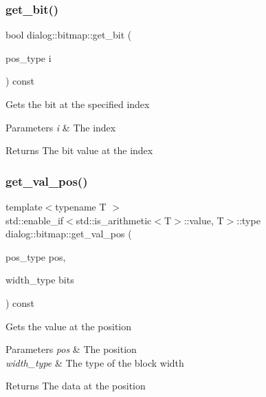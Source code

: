 \mbox{\label{classdialog_1_1bitmap_a50fa02f2e4a94c567f67761988c78d7f}} 
\subsubsection{\texorpdfstring{get\+\_\+bit()}{get\_bit()}}
{\footnotesize\ttfamily bool dialog\+::bitmap\+::get\+\_\+bit (\begin{DoxyParamCaption}\item[{pos\+\_\+type}]{i }\end{DoxyParamCaption}) const\hspace{0.3cm}{\ttfamily [inline]}}

Gets the bit at the specified index 
\begin{DoxyParams}{Parameters}
{\em i} & The index \\
\hline
\end{DoxyParams}
\begin{DoxyReturn}{Returns}
The bit value at the index 
\end{DoxyReturn}
\mbox{\label{classdialog_1_1bitmap_aa56b2e9be38fd068ac374f2f7a33120b}} 
\subsubsection{\texorpdfstring{get\+\_\+val\+\_\+pos()}{get\_val\_pos()}}
{\footnotesize\ttfamily template$<$typename T $>$ \\
std\+::enable\+\_\+if$<$std\+::is\+\_\+arithmetic$<$T$>$\+::value, T$>$\+::type dialog\+::bitmap\+::get\+\_\+val\+\_\+pos (\begin{DoxyParamCaption}\item[{pos\+\_\+type}]{pos,  }\item[{width\+\_\+type}]{bits }\end{DoxyParamCaption}) const\hspace{0.3cm}{\ttfamily [inline]}}

Gets the value at the position 
\begin{DoxyParams}{Parameters}
{\em pos} & The position \\
\hline
{\em width\+\_\+type} & The type of the block width \\
\hline
\end{DoxyParams}
\begin{DoxyReturn}{Returns}
The data at the position 
\end{DoxyReturn}
\mbox{\label{classdialog_1_1bitmap_a2066fd879c2e7c3d18ff590e9f1826b8}} 
